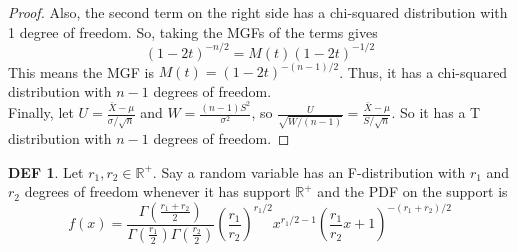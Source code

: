 \documentclass{article}
\theoremstyle{definition}\newtheorem{definition}{DEF}
\theoremstyle{definition}\newtheorem{example}{Ex}
\theoremstyle{lemma}\newtheorem{lemma}{Lemma}
\theoremstyle{corrolary}\newtheorem{corrolary}{Cor}
\begin{document}
\begin{proof}
Also, the second term on the right side has a chi-squared distribution with 1 degree of freedom.
So, taking the MGFs of the terms gives
\begin{equation*}
\left(1-2t \right)^{-n/2} = M(t) \left( 1-2t \right)^{-1/2}
\end{equation*}
This means the MGF is $M(t)=\left( 1-2t \right)^{-(n-1)/2}$.
Thus, it has a chi-squared distribution with $n-1$ degrees of freedom. \\
Finally, let $U=\frac{\bar{X}-\mu}{\sigma/\sqrt{n}}$ and $W=\frac{(n-1)S^2}{\sigma^2}$, so $\frac{U}{\sqrt{W/(n-1)}}=\frac{\bar{X}-\mu}{S/\sqrt{n}}$.
So it has a T distribution with $n-1$ degrees of freedom.
\end{proof}

\begin{definition}
Let $r_1, r_2 \in \mathbb{R}^+$.
Say a random variable has an F-distribution with $r_1$ and $r_2$ degrees of freedom whenever it has support $\mathbb{R}^+$ and the PDF on the support is
\begin{equation}
f(x)=\frac{\Gamma\left( \frac{r_1 +r_2}{2}\right)}{\Gamma \left( \frac{r_1}{2}\right)\Gamma \left( \frac{r_2}{2}\right)}\left( \frac{r_1}{r_2}\right)^{r_1/2}x^{r_1/2-1}\left( \frac{r_1}{r_2} x +1\right)^{- \left( r_1 + r_2 \right) /2}
\end{equation}
\end{definition}
\end{document}
